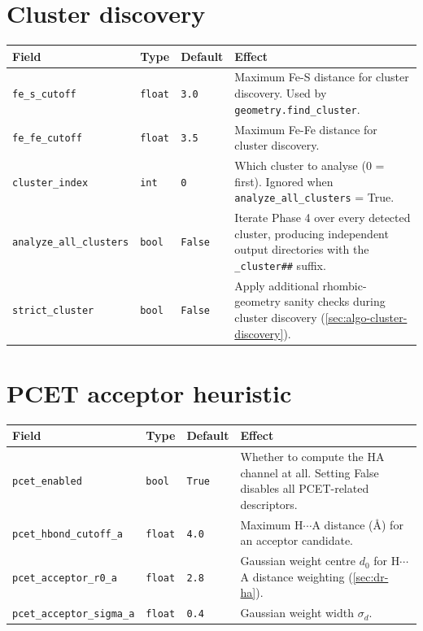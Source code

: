 \documentclass[10pt,a4paper,twoside]{article}
\newcommand{\fn}[1]{\texttt{#1}}
\newcommand{\cfgkey}[1]{\texttt{#1}}
\begin{document}
\section{Cluster discovery}

\begin{longtable}{p{} p{} p{} p{}}
\toprule
\textbf{Field} & \textbf{Type} & \textbf{Default} & \textbf{Effect} \\
\midrule
\cfgkey{fe\_s\_cutoff} & \texttt{float} & \texttt{3.0}
  & Maximum Fe-S distance for cluster discovery. Used by
    \fn{geometry.find\_cluster}. \\
\cfgkey{fe\_fe\_cutoff} & \texttt{float} & \texttt{3.5}
  & Maximum Fe-Fe distance for cluster discovery. \\
\cfgkey{cluster\_index} & \texttt{int} & \texttt{0}
  & Which cluster to analyse (0 = first). Ignored when
    \cfgkey{analyze\_all\_clusters} = True. \\
\cfgkey{analyze\_all\_clusters} & \texttt{bool} & \texttt{False}
  & Iterate Phase 4 over every detected cluster, producing
    independent output directories with the
    \texttt{\_cluster\#\#} suffix. \\
\cfgkey{strict\_cluster} & \texttt{bool} & \texttt{False}
  & Apply additional rhombic-geometry sanity checks during cluster
    discovery (\cref{sec:algo-cluster-discovery}). \\
\bottomrule
\end{longtable}

\section{PCET acceptor heuristic}

\begin{longtable}{p{} p{} p{} p{}}
\toprule
\textbf{Field} & \textbf{Type} & \textbf{Default} & \textbf{Effect} \\
\midrule
\cfgkey{pcet\_enabled} & \texttt{bool} & \texttt{True}
  & Whether to compute the HA channel at all. Setting False
    disables all PCET-related descriptors. \\
\cfgkey{pcet\_hbond\_cutoff\_a} & \texttt{float} & \texttt{4.0}
  & Maximum H$\cdots$A distance (\AA{}) for an acceptor candidate. \\
\cfgkey{pcet\_acceptor\_r0\_a} & \texttt{float} & \texttt{2.8}
  & Gaussian weight centre $d_0$ for H$\cdots$A distance weighting
    (\cref{sec:dr-ha}). \\
\cfgkey{pcet\_acceptor\_sigma\_a} & \texttt{float} & \texttt{0.4}
  & Gaussian weight width $\sigma_d$. \\
\bottomrule
\end{longtable}
\end{document}
